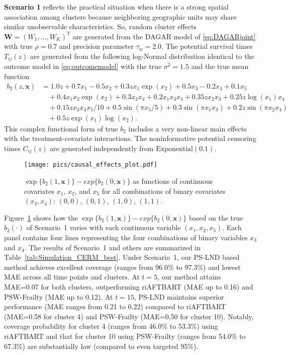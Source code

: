 \documentclass[aoas]{imsart}
\theoremstyle{plain}
\theoremstyle{definition}
\begin{document}
 \textbf{Scenario 1}  reflects the practical situation when there is a strong spatial association among clusters because neighboring geographic units may share similar unobservable characteristics. So, random cluster effects $\mathbf{W} = (W_1, \ldots, W_K)^T$ are generated from the DAGAR model of \eqref{eq:DAGARjoint} with true  $\rho = 0.7$ and precision parameter $\tau_w = 2.0$. The potential survival times $T_{ij}(z)$ are generated from the following log-Normal distribution identical to the outcome model in \eqref{eq:outcomemodel} with the true $\sigma^2=1.5$ and the true mean function 
\begin{align}
\nonumber
b_2(z,\mathbf{x}) &= 1.0z + 0.7x_1 - 0.5x_2 + 0.3zx_1\exp(x_2) + 0.5x_3 - 0.2x_4 + 0.1x_5\\ \nonumber
&\quad + 0.4x_1x_2\exp(x_2) + 0.3x_2x_4 + 0.2x_1x_3x_4 + 0.35zx_2x_3 + 0.25z\log(x_1)x_4\\ \nonumber
&\quad + 0.15zx_3x_4x_5/10 + 0.5\sin(\pi x_5/5) + 0.3\sin(\pi x_1x_3) + 0.2z\sin(\pi x_2x_4)\\ \nonumber
&\quad + 0.5z\exp(x_1)\log(x_2). 
\end{align}
This complex functional form of true $b_2$ includes a very non-linear main effects with the treatment-covariate interactions. The noninformative potential censoring times $C_{ij}(z)$ are generated independently from $\text{Exponential}(0.1)$.
\begin{figure}[ht]
\centering
\texttt{[image: pics/causal\_effects\_plot.pdf]}

\caption{ $\exp\{b_2(1,\mathbf{x})\} - exp\{b_2(0,\mathbf{x})\}$ as functions of continuous covariates $x_1$, $x_2$, and $x_5$ for all combinations of binary covariates $(x_3, x_4)$: \colorbox{viridis1}{\textcolor{white}{\phantom{x}}} $(0,0)$, \colorbox{viridis2}{\textcolor{white}{\phantom{x}}} $(0,1)$, \colorbox{viridis3}{\phantom{x}} $(1,0)$, \colorbox{viridis4}{\phantom{x}} $(1,1)$.}
\label{fig:causal_effects}
\end{figure}
Figure~\ref{fig:causal_effects} shows how the $\exp\{b_2(1,\mathbf{x})\} - exp\{b_2(0,\mathbf{x})\}$ based on the true $b_2(\cdot)$ of Scenario~1 varies with each continuous variable $(x_1, x_2, x_5)$. Each panel contains four lines representing the four combinations of binary variables $x_3$ and $x_4$.
The results of Scenario~1 and others are summarized in Table~\ref{tab:Simulation_CERM_best}.
Under Scenario~1, our PS-LND based method achieves excellent coverage (ranges from 96.0\% to 97.3\%) and lowest MAE across all time points and clusters. At $t=5$, our method attains MAE=0.07 for both clusters, outperforming riAFTBART (MAE up to 0.16) and PSW-Frailty (MAE up to 0.12). At $t=15$, PS-LND maintains superior performance (MAE ranges from 0.21 to 0.22) compared to riAFTBART (MAE=0.58 for cluster 4) and PSW-Frailty (MAE=0.50 for cluster 10). Notably, coverage probability for  cluster 4 (ranges from 46.0\% to 53.3\%) using riAFTBART and that for cluster 10 using PSW-Frailty (ranges from 54.0\% to 67.3\%) are substantially low (compared to even targeted 95\%).
\end{document}
